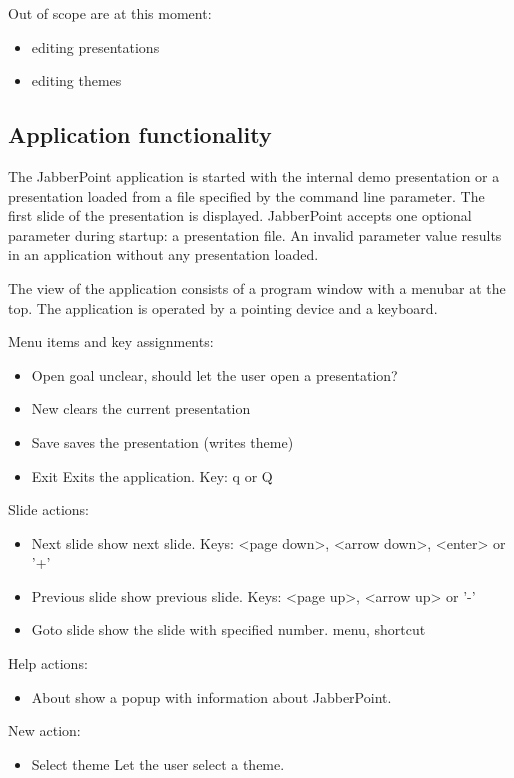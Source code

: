 \documentclass[a4paper]{article}
\begin{document}
Out of scope are at this moment:
\begin{itemize}
\item editing presentations
\item editing themes 
\end{itemize}

\subsection{Application functionality}
The JabberPoint application is started with the internal demo presentation or a presentation loaded from a file specified by the command line parameter. The first slide of the presentation is displayed.
JabberPoint accepts one optional parameter during startup: a presentation file. 
An invalid parameter value results in an application without any presentation loaded.

The view of the application consists of a program window with a menubar at the top. The application is operated by a pointing device and a keyboard. 

Menu items and key assignments:
\begin{itemize}
\item{Open} goal unclear, should let the user open a presentation? 
\item{New} clears the current presentation
\item{Save} saves the presentation (writes theme)
\item{Exit} Exits the application. Key: q or Q
\end{itemize}

Slide actions:
\begin{itemize}
\item{Next slide} show next slide. Keys: <page down>, <arrow down>, <enter> or '+'
\item{Previous slide} show previous slide. Keys: <page up>, <arrow up> or '-'
\item{Goto slide} show the slide with specified number. menu, shortcut
\end{itemize}

Help actions:
\begin{itemize}
\item{About} show a popup with information about JabberPoint.
\end{itemize}

New action:
\begin{itemize}
\item{Select theme} Let the user select a theme. 
\end{itemize}
\end{document}
